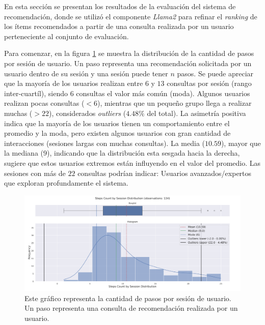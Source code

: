 \documentclass[11pt,a4paper,twoside]{thesis}
\begin{document}
En esta sección se presentan los resultados de la evaluación del sistema de recomendación, donde se utilizó el componente \textit{Llama2} para refinar el \textit{ranking} de los ítems recomendados a partir de una consulta realizada por un usuario perteneciente al conjunto de evaluación.

Para comenzar, en la figura \ref{fig:llama2-steps_count_by_session_distribution} se muestra la distribución de la cantidad de pasos por sesión de usuario. Un paso representa una recomendación solicitada por un usuario dentro de su sesión y una sesión puede tener $n$ pasos. Se puede apreciar que la mayoría de los usuarios realizan entre $6$ y $13$ consultas por sesión (rango inter-cuartíl), siendo $6$ consultas el valor más común (moda).
Algunos usuarios realizan pocas consultas ($<6$), mientras que un pequeño grupo llega a realizar muchas ($>22$), considerados \textit{outliers} ($4.48\%$ del total). La asimetría positiva indica que la mayoría de los usuarios tienen un comportamiento entre el promedio y la moda, pero existen algunos usuarios con gran cantidad de interacciones (sesiones largas con muchas consultas). La media ($10.59$), mayor que la mediana ($9$), indicando que la distribución esta sesgada hacia la derecha, sugiere que estos usuarios extremos están influyendo en el valor del promedio. Las sesiones con más de $22$ consultas podrían indicar: Usuarios avanzados/expertos que exploran profundamente el sistema.

\begin{figure}[H]
	\centering
	\includegraphics[width=15cm]{./images/llama2/steps_count_by_session_distribution.png}
	\caption{Este gráfico representa la cantidad de pasos por sesión de usuario. Un paso representa una consulta de recomendación realizada por un usuario.}
	\label{fig:llama2-steps_count_by_session_distribution}
\end{figure}
\end{document}

